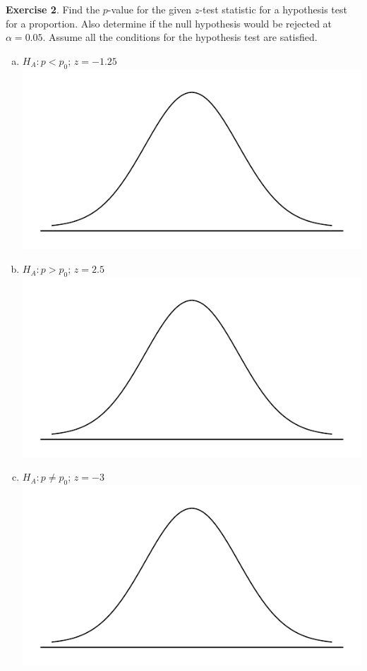 \documentclass[11pt]{article}\usepackage[]{graphicx}\usepackage[]{color}
\begin{document}
\textbf{Exercise 2}.  Find the $p$-value for the given $z$-test statistic for a hypothesis test for a proportion.  Also determine if the null hypothesis would be rejected at $\alpha = 0.05$.  Assume all the conditions for the hypothesis test are satisfied.
\begin{enumerate}[(a)]
\item $H_A: p < p_0$; $z = -1.25$\\
\includegraphics[scale=0.5]{figure/norm_draw}\\
\vspace{2cm}

\item $H_A: p > p_0$; $z = 2.5$\\
\includegraphics[scale=0.5]{figure/norm_draw}\\
\vspace{2cm}

\item $H_A: p \neq p_0$; $z = -3$\\
\includegraphics[scale=0.5]{figure/norm_draw}\\
\end{enumerate}
\end{document}
